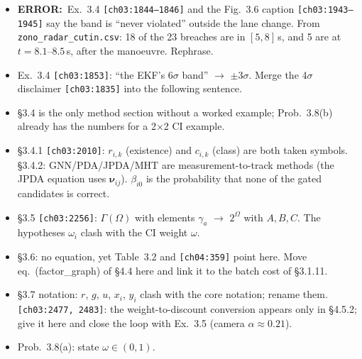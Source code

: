 \documentclass[10pt,a4paper]{article}
\newcommand{\src}[1]{{\footnotesize\texttt{[#1]}}}
\newcommand{\err}{\textbf{ERROR:}~}
\begin{document}
\begin{itemize}
\item \err Ex.~3.4 \src{ch03:1844--1846} and the Fig.~3.6 caption \src{ch03:1943--1945} say the band is ``never violated'' outside the lane change. From \texttt{zono\_radar\_cutin.csv}: 18 of the 23 breaches are in $[5,8]$\,s, and 5 are at $t=8.1$--$8.5$\,s, after the manoeuvre. Rephrase.
\item Ex.~3.4 \src{ch03:1853}: ``the EKF's $6\sigma$ band'' $\to$ $\pm3\sigma$. Merge the 4$\sigma$ disclaimer \src{ch03:1835} into the following sentence.
\item \S3.4 is the only method section without a worked example; Prob.~3.8(b) already has the numbers for a 2$\times$2 CI example.
\item \S3.4.1 \src{ch03:2010}: $r_{i,k}$ (existence) and $c_{i,k}$ (class) are both taken symbols. \S3.4.2: GNN/PDA/JPDA/MHT are measurement-to-track methods (the JPDA equation uses $\boldsymbol\nu_{ij}$). $\beta_{i0}$ is the probability that none of the gated candidates is correct.
\item \S3.5 \src{ch03:2256}: $\Gamma(\Omega)$ with elements $\gamma_a$ $\to$ $2^\Omega$ with $A,B,C$. The hypotheses $\omega_i$ clash with the CI weight $\omega$.
\item \S3.6: no equation, yet Table~3.2 and \src{ch04:359} point here. Move eq.~(factor\_graph) of \S4.4 here and link it to the batch cost of \S3.1.11.
\item \S3.7 notation: $r$, $g$, $u$, $x_i$, $y_i$ clash with the core notation; rename them. \src{ch03:2477, 2483}: the weight-to-discount conversion appears only in \S4.5.2; give it here and close the loop with Ex.~3.5 (camera $\alpha\approx0.21$).
\item Prob.~3.8(a): state $\omega\in(0,1)$.
\end{itemize}
\end{document}
